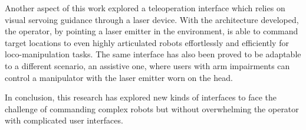 Another aspect of this work explored a teleoperation interface which relies on visual servoing guidance through a laser device. With the architecture developed, the operator, by pointing a laser emitter in the environment, is able to command target locations to even highly articulated robots effortlessly and efficiently for loco-manipulation tasks. The same interface has also been proved to be adaptable to a different scenario, an assistive one, where users with arm impairments can control a manipulator with the laser emitter worn on the head.    

In conclusion, this research has explored new kinds of interfaces to face the challenge of commanding complex robots but without overwhelming the operator with complicated user interfaces.